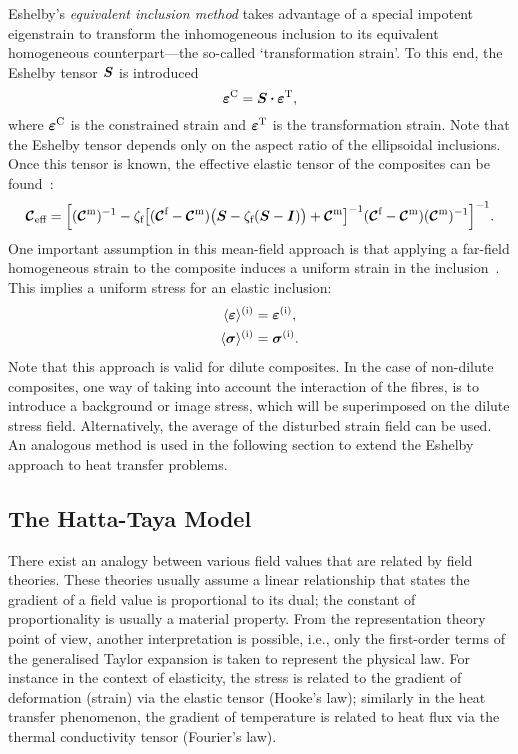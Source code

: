 	Eshelby's \textit{equivalent inclusion method} takes advantage of a special impotent eigenstrain to transform the inhomogeneous inclusion to its equivalent homogeneous counterpart---the so-called `transformation strain'. To this end, the Eshelby tensor $\tenb{S}$ is introduced
	\begin{equation}
	\tenb{\varepsilon}^\text{C}=\tenb{S}\scp\tenb{\varepsilon}^\text{T},
	\end{equation}
	where $\tenb{\varepsilon}^\text{C}$ is the constrained strain and $\tenb{\varepsilon}^\text{T}$ is the transformation strain. Note that the Eshelby tensor depends only on the aspect ratio of the ellipsoidal inclusions. Once this tensor is known, the effective elastic tensor of the composites can be found~\autocite{Clyne.2019}:
	\begin{equation}
	\tend{C}_\text{eff}=\Big[(\tend{C}^\text{m})^\inv-\zeta_\text{f}\big[ (\tend{C}^\text{f}-\tend{C}^\text{m})\big(\tenb{S}-\zeta_\text{f}(\tenb{S}-\unitb)\big)+\tend{C}^\text{m}\big]^\inv(\tend{C}^\text{f}-\tend{C}^\text{m})(\tend{C}^\text{m})^\inv\Big]^\inv.
	\end{equation}
	One important assumption in this mean-field approach is that applying a far-field homogeneous strain to the composite induces a uniform strain in the inclusion~\autocite{Bohm.2020}. This implies a uniform stress for an elastic inclusion:
	\begin{subequations}
	\begin{align}
	\avevol{\tenb{\varepsilon}}^\text{(i)}&=\tenb{\varepsilon}^\text{(i)},\\
	\avevol{\tenb{\sigma}}^\text{(i)}&=\tenb{\sigma}^\text{(i)}.
	\end{align}
	\end{subequations}
	Note that this approach is valid for dilute composites. In the case of non-dilute composites, one way of taking into account the interaction of the fibres, is to introduce a background or image stress, which will be superimposed on the dilute stress field. Alternatively, the average of the disturbed strain field can be used. An analogous method is used in the following section to extend the Eshelby approach to heat transfer problems.

\subsection{The Hatta-Taya Model}
	There exist an analogy between various field values that are related by field theories. These theories usually assume a linear relationship that states the gradient of a field value is proportional to its dual; the constant of proportionality is usually a material property. From the representation theory point of view, another interpretation is possible, i.e., only the first-order terms of the generalised Taylor expansion is taken to represent the physical law. For instance in the context of elasticity, the stress is related to the gradient of deformation (strain) via the elastic tensor (Hooke's law); similarly in the heat transfer phenomenon, the gradient of temperature is related to heat flux via the thermal conductivity tensor (Fourier's law).

